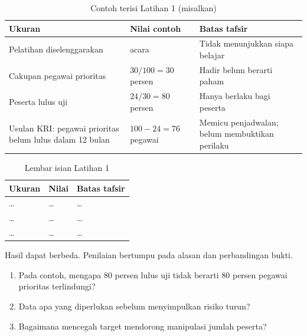 \begin{table}[!htb]
  \centering\small
  \caption{Contoh terisi Latihan 1 (misalkan)}\label{tab:ch13-lat1-contoh}
  \begin{tabularx}{\textwidth}{|>{\raggedright\arraybackslash}X|>{\raggedright\arraybackslash}p{}|>{\raggedright\arraybackslash}X|}
    \hline
    \textbf{Ukuran} & \textbf{Nilai contoh} & \textbf{Batas tafsir} \\ \hline
    Pelatihan diselenggarakan & 12 acara & Tidak menunjukkan siapa belajar \\ \hline
    Cakupan pegawai prioritas & $30 / 100 = 30$ persen & Hadir belum berarti paham \\ \hline
    Peserta lulus uji & $24 / 30 = 80$ persen & Hanya berlaku bagi peserta \\ \hline
    Usulan KRI: pegawai prioritas belum lulus dalam 12 bulan & $100 - 24 = 76$ pegawai & Memicu
    penjadwalan; belum membuktikan perilaku \\ \hline
  \end{tabularx}
\end{table}

\begin{table}[!htb]
  \centering\small
  \caption{Lembar isian Latihan 1}\label{tab:ch13-lat1-hasil}
  \begin{tabularx}{\textwidth}{|>{\raggedright\arraybackslash}X|>{\raggedright\arraybackslash}p{}|>{\raggedright\arraybackslash}X|}
    \hline
    \textbf{Ukuran} & \textbf{Nilai} & \textbf{Batas tafsir} \\ \hline
    \dots & \dots & \dots \\ \hline
    \dots & \dots & \dots \\ \hline
    \dots & \dots & \dots \\ \hline
  \end{tabularx}
\end{table}

Hasil dapat berbeda. Penilaian bertumpu pada alasan dan perbandingan bukti.
\begin{enumerate}
  \item Pada contoh, mengapa 80 persen lulus uji tidak berarti 80 persen pegawai prioritas
  terlindungi?
  \item Data apa yang diperlukan sebelum menyimpulkan risiko turun?
  \item Bagaimana mencegah target mendorong manipulasi jumlah peserta?
\end{enumerate}

